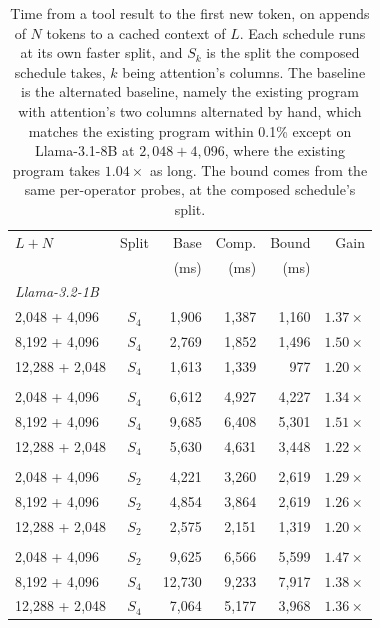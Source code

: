 \begin{table}[t]
\caption{Time from a tool result to the first new token, on appends of $N$ tokens to a cached context of $L$. Each schedule runs at its own faster split, and $S_k$ is the split the composed schedule takes, $k$ being attention's columns. The baseline is the alternated baseline, namely the existing program with attention's two columns alternated by hand, which matches the existing program within 0.1\% except on Llama-3.1-8B at $2{,}048 + 4{,}096$, where the existing program takes $1.04\times$ as long. The bound comes from the same per-operator probes, at the composed schedule's split.}
\label{tab:append}
\vskip 0.1in
\centering
\small
\begin{tabular}{lcrrrr}
\toprule
$L + N$ & Split & Base & Comp. & Bound & Gain \\
        &       & (ms) & (ms)  & (ms)  &      \\
\midrule
\multicolumn{6}{l}{\textit{Llama-3.2-1B}} \\
2{,}048 + 4{,}096 & $S_4$ & 1{,}906 & 1{,}387 & 1{,}160 & $1.37\times$ \\
8{,}192 + 4{,}096 & $S_4$ & 2{,}769 & 1{,}852 & 1{,}496 & $1.50\times$ \\
12{,}288 + 2{,}048 & $S_4$ & 1{,}613 & 1{,}339 & 977 & $1.20\times$ \\
\addlinespace[2pt]
\multicolumn{6}{l}{\textit{Qwen3-4B}} \\
2{,}048 + 4{,}096 & $S_4$ & 6{,}612 & 4{,}927 & 4{,}227 & $1.34\times$ \\
8{,}192 + 4{,}096 & $S_4$ & 9{,}685 & 6{,}408 & 5{,}301 & $1.51\times$ \\
12{,}288 + 2{,}048 & $S_4$ & 5{,}630 & 4{,}631 & 3{,}448 & $1.22\times$ \\
\addlinespace[2pt]
\multicolumn{6}{l}{\textit{Gemma3-4B}} \\
2{,}048 + 4{,}096 & $S_2$ & 4{,}221 & 3{,}260 & 2{,}619 & $1.29\times$ \\
8{,}192 + 4{,}096 & $S_2$ & 4{,}854 & 3{,}864 & 2{,}619 & $1.26\times$ \\
12{,}288 + 2{,}048 & $S_2$ & 2{,}575 & 2{,}151 & 1{,}319 & $1.20\times$ \\
\addlinespace[2pt]
\multicolumn{6}{l}{\textit{Llama-3.1-8B}} \\
2{,}048 + 4{,}096 & $S_2$ & 9{,}625 & 6{,}566 & 5{,}599 & $1.47\times$ \\
8{,}192 + 4{,}096 & $S_4$ & 12{,}730 & 9{,}233 & 7{,}917 & $1.38\times$ \\
12{,}288 + 2{,}048 & $S_4$ & 7{,}064 & 5{,}177 & 3{,}968 & $1.36\times$ \\
\bottomrule
\end{tabular}
\vskip -0.1in
\end{table}
